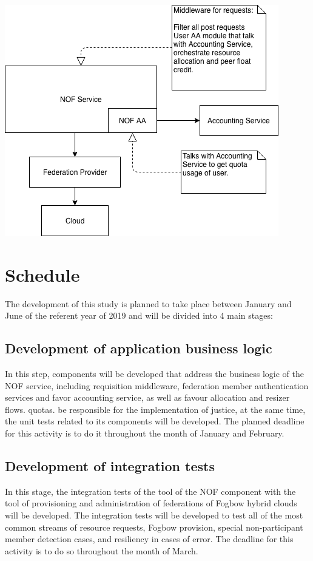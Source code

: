 \documentclass{article}
\begin{document}
\includegraphics[scale=0.4]{./image/NOF-architecture-generic.png}

\section{Schedule}

The development of this study is planned to take place between January and June of the referent year of 2019 and will be divided into 4 main stages:
\subsection{Development of application business logic}
	In this step, components will be developed that address the business logic of the NOF service, including requisition middleware, federation member authentication services and favor accounting service, as well as favour allocation and resizer flows. quotas. be responsible for the implementation of justice, at the same time, the unit tests related to its components will be developed. The planned deadline for this activity is to do it throughout the month of January and February.
\subsection{Development of integration tests}
    In this stage, the integration tests of the tool of the NOF component with the tool of provisioning and administration of federations of Fogbow hybrid clouds will be developed. The integration tests will be developed to test all of the most common streams of resource requests, Fogbow provision, special non-participant member detection cases, and resiliency in cases of error. The deadline for this activity is to do so throughout the month of March.
\end{document}
